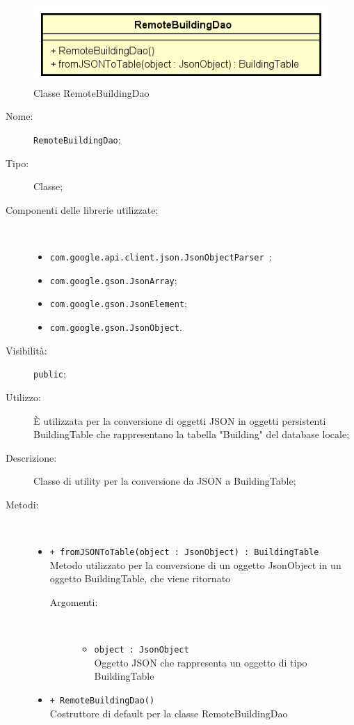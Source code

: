 \documentclass[../DefinizioneDiProdotto.tex]{subfiles}
\begin{document}
    \begin{figure}[H]
        \centering
        \includegraphics{img/RemoteBuildingDao.png}
        \caption{Classe RemoteBuildingDao}\label{fig:model::dataaccess::dao::RemoteBuildingDao} 
    \end{figure}
    \begin{description}
\item[Nome:] \texttt{RemoteBuildingDao};
\item[Tipo:] Classe;
\item[Componenti delle librerie utilizzate:] \
\begin{itemize}
\item \texttt{com.google.api.client.json.JsonObjectParser
};

\item \texttt{com.google.gson.JsonArray};

\item \texttt{com.google.gson.JsonElement};

\item \texttt{com.google.gson.JsonObject}.

\end{itemize}
\item[Visibilità:] \texttt{public};
\item[Utilizzo:] È utilizzata per la conversione di oggetti JSON in oggetti persistenti BuildingTable che rappresentano la tabella "Building" del database locale;
\item[Descrizione:] Classe di utility per la conversione da JSON a BuildingTable;
\item[Metodi:] \
\begin{itemize}
\item \texttt{+ fromJSONToTable(object : JsonObject) : BuildingTable}\\
Metodo utilizzato per la conversione di un oggetto JsonObject in un oggetto BuildingTable, che viene ritornato
 \begin{description}
\item[Argomenti:] \
\begin{itemize}
\item \texttt{object : JsonObject}\\
Oggetto JSON che rappresenta un oggetto di tipo BuildingTable\end{itemize}
\end{description}
\item \texttt{+ RemoteBuildingDao()}\\
Costruttore di default per la classe RemoteBuildingDao
 \end{itemize}
\end{description}
\end{document}

